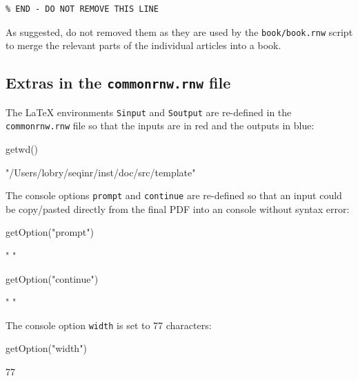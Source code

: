 \documentclass{article}
\begin{document}
\begin{verbatim}
% END - DO NOT REMOVE THIS LINE
\end{verbatim}

As suggested, do not removed them as they are used by the \texttt{book/book.rnw}
script to merge the relevant parts of the individual articles into
a book.

\subsection{Extras in the \texttt{commonrnw.rnw} file}

The \LaTeX{} environments \texttt{Sinput} and \texttt{Soutput}
are re-defined in the \texttt{commonrnw.rnw} file so that the
\Rlogo{} inputs are in red and the \Rlogo{} outputs in blue:

\begin{Schunk}
\begin{Sinput}
 getwd()
\end{Sinput}
\begin{Soutput}
[1] "/Users/lobry/seqinr/inst/doc/src/template"
\end{Soutput}
\end{Schunk}

The \Rlogo{} console options \texttt{prompt} and \texttt{continue}
are re-defined so that an \Rlogo{} input could be copy/pasted
directly from the final PDF into an \Rlogo{} console without
syntax error:

\begin{Schunk}
\begin{Sinput}
 getOption("prompt")
\end{Sinput}
\begin{Soutput}
[1] " "
\end{Soutput}
\begin{Sinput}
 getOption("continue")
\end{Sinput}
\begin{Soutput}
[1] " "
\end{Soutput}
\end{Schunk}

The \Rlogo{} console option \texttt{width} is set to 77 characters:

\begin{Schunk}
\begin{Sinput}
 getOption("width")
\end{Sinput}
\begin{Soutput}
[1] 77
\end{Soutput}
\end{Schunk}
\end{document}
